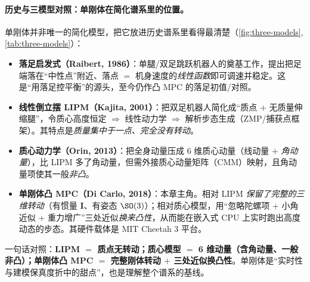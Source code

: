 \paragraph{历史与三模型对照：单刚体在简化谱系里的位置。}
单刚体并非唯一的简化模型，把它放进历史谱系里看得最清楚（\cref{fig:three-models},\cref{tab:three-models}）：
\begin{itemize}
  \item \textbf{落足启发式（Raibert, 1986）}\cite{raibert1986legged}：单腿/双足跳跃机器人的奠基工作，提出把足端落在“中性点”附近、落点 $=$ 机身速度的\emph{线性函数}即可调速并稳定。这是“用落足控平衡”的源头，至今仍作凸 MPC 的落足初值/对照。
  \item \textbf{线性倒立摆 LIPM（Kajita, 2001）}\cite{kajita2001lipm}：把双足机器人简化成“质点 + 无质量伸缩腿”，令质心高度恒定 $\Rightarrow$ 线性动力学 $\Rightarrow$ 解析步态生成（ZMP/捕获点框架）。其特点是\emph{质量集中于一点、完全没有转动}。
  \item \textbf{质心动力学（Orin, 2013）}\cite{orin2013centroidal}：把全身动量压成 $6$ 维质心动量（线动量 $+$ \emph{角动量}），比 LIPM 多了角动量，但需外接质心动量矩阵（CMM）映射，且角动量项使其一般\emph{非凸}。
  \item \textbf{单刚体凸 MPC（Di Carlo, 2018）}\cite{dicarlo2018cheetah}：本章主角。相对 LIPM \emph{保留了完整的三维转动}（有惯量 $\mathbf{I}$、有姿态 $\SO(3)$）；相对质心模型，用“忽略陀螺项 + 小角近似 + 重力增广”三处近似\emph{换来凸性}，从而能在嵌入式 CPU 上实时跑出高度动态的步态。其硬件载体是 MIT Cheetah 3 平台\cite{bledt2018cheetah3}。
\end{itemize}
一句话对照：\textbf{LIPM $=$ 质点无转动；质心模型 $=$ 6 维动量（含角动量、一般非凸）；单刚体凸 MPC $=$ 完整刚体转动 $+$ 三处近似换凸性}。单刚体是“实时性与建模保真度折中的甜点”，也是理解整个谱系的基线\cite{wensing2024legged}。

